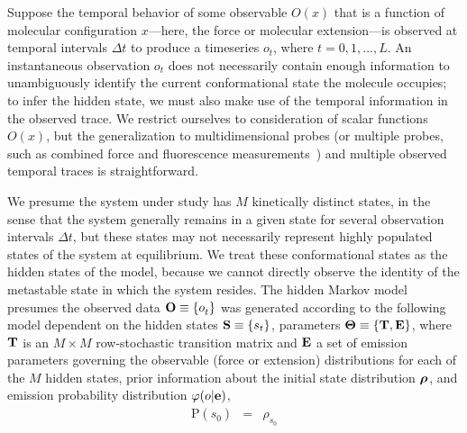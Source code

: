 \documentclass[aps,pre,twocolumn,superscriptaddress,nofootinbib,longbibliography]{revtex4-1}
\newcommand{\bfv}[1]{{\mbox{\boldmath{$#1$}}}}
\newcommand{\bfm}[1]{{\bf #1}}
\renewcommand{\Pr}{\mathrm{P}}
\begin{document}
{Suppose the temporal behavior of some observable $O(x)$ that is a function of molecular configuration $x$---here, the force or molecular extension---is observed at temporal intervals $\Delta t$ to produce a timeseries $o_t$, where $t = 0, 1, \ldots, L$.
An instantaneous observation $o_t$ does not necessarily contain enough information to unambiguously identify the current conformational state the molecule occupies; to infer the hidden state, we must also make use of the temporal information in the observed trace.
We restrict ourselves to consideration of scalar functions $O(x)$, but the generalization to multidimensional probes (or multiple probes, such as combined force and fluorescence measurements~\cite{chemla:nature-methods:2011:fluorescence-force}) and multiple observed temporal traces is straightforward.

We presume the system under study has $M$ kinetically distinct states, in the sense that the system generally remains in a given state for several observation intervals $\Delta t$, but these states may not necessarily represent highly populated states of the system at equilibrium.
We treat these conformational states as the hidden states of the model, because we cannot directly observe the identity of the metastable state in which the system resides.
The hidden Markov model presumes the observed data $\bfm{O} \equiv \{o^{}_t\}$ was generated according to the following model dependent on {\color{red} the hidden states $\bfm{S} \equiv \{s_t\}$,} parameters $\bfm{\Theta} \equiv \{\bfm{T}, \bfm{E}\}$, where $\bfm{T}$ is an $M \times M$ row-stochastic transition matrix and $\bfm{E}$ a set of emission parameters governing the observable (force or extension) distributions for each of the $M$ hidden states, prior information about the initial state distribution $\bfv{\rho}^{}$, {\color{red} and emission probability distribution $\varphi(o | \bfm{e})$},
\begin{eqnarray}
\Pr(s^{}_0) &=& \rho^{}_{s^{}_0} \nonumber \\

\end{eqnarray}}
\end{document}
